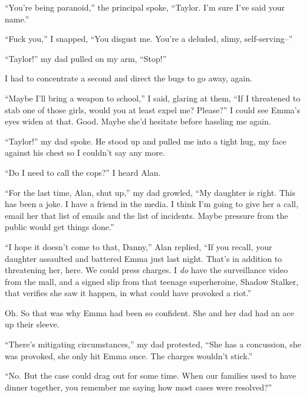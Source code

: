``You're being paranoid,'' the principal spoke, ``Taylor.  I'm sure I've said your name.''



``Fuck you,'' I snapped, ``You disgust me.  You're a deluded, slimy, self-serving--''



``Taylor!'' my dad pulled on my arm, ``Stop!''



I had to concentrate a second and direct the bugs to go away, again.



``Maybe I'll bring a weapon to school,'' I said, glaring at them, ``If I threatened to stab one of those girls, would you at least expel me?  Please?''  I could see Emma's eyes widen at that.  Good.  Maybe she'd hesitate before hassling me again.



``Taylor!'' my dad spoke.  He stood up and pulled me into a tight hug, my face against his chest so I couldn't say any more.



``Do I need to call the cops?'' I heard Alan.



``For the last time, Alan, shut up,'' my dad growled, ``My daughter is right.  This has been a joke.  I have a friend in the media.  I think I'm going to give her a call, email her that list of emails and the list of incidents.  Maybe pressure from the public would get things done.''



``I hope it doesn't come to that, Danny,'' Alan replied, ``If you recall, your daughter assaulted and battered Emma just last night.  That's in addition to threatening her, here.  We could press charges.  I \emph{do} have the surveillance video from the mall, and a signed slip from that teenage superheroine, Shadow Stalker, that verifies she saw it happen, in what could have provoked a riot.''



Oh.  So that was why Emma had been so confident.  She and her dad had an ace up their sleeve.



``There's mitigating circumstances,'' my dad protested, ``She has a concussion, she was provoked, she only hit Emma once.  The charges wouldn't stick.''



``No.  But the case could drag out for some time.  When our families used to have dinner together, you remember me saying how most cases were resolved?''



